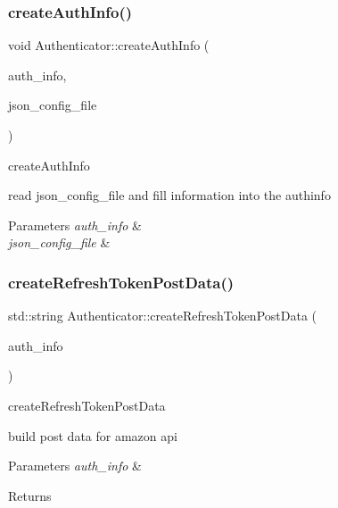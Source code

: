 \subsubsection{\texorpdfstring{create\+Auth\+Info()}{createAuthInfo()}}
{\footnotesize\ttfamily void Authenticator\+::create\+Auth\+Info (\begin{DoxyParamCaption}\item[{\hyperlink{classAuth_1_1AuthInfo}{Auth\+Info} $\ast$}]{auth\+\_\+info,  }\item[{std\+::string}]{json\+\_\+config\+\_\+file }\end{DoxyParamCaption})}



create\+Auth\+Info 

read json\+\_\+config\+\_\+file and fill information into the authinfo


\begin{DoxyParams}{Parameters}
{\em auth\+\_\+info} & \\
\hline
{\em json\+\_\+config\+\_\+file} & \\
\hline
\end{DoxyParams}
\mbox{\label{classAuth_1_1Authenticator_a6b2064f905799b93b0f2bdb78fc99b19}} 
\subsubsection{\texorpdfstring{create\+Refresh\+Token\+Post\+Data()}{createRefreshTokenPostData()}}
{\footnotesize\ttfamily std\+::string Authenticator\+::create\+Refresh\+Token\+Post\+Data (\begin{DoxyParamCaption}\item[{\hyperlink{classAuth_1_1AuthInfo}{Auth\+Info} $\ast$}]{auth\+\_\+info }\end{DoxyParamCaption})\hspace{0.3cm}{\ttfamily [protected]}}



create\+Refresh\+Token\+Post\+Data 

build post data for amazon api 
\begin{DoxyParams}{Parameters}
{\em auth\+\_\+info} & \\
\hline
\end{DoxyParams}
\begin{DoxyReturn}{Returns}

\end{DoxyReturn}
\mbox{\label{classAuth_1_1Authenticator_ae75b09665bc042b3e599a22ec12fed71}} 
